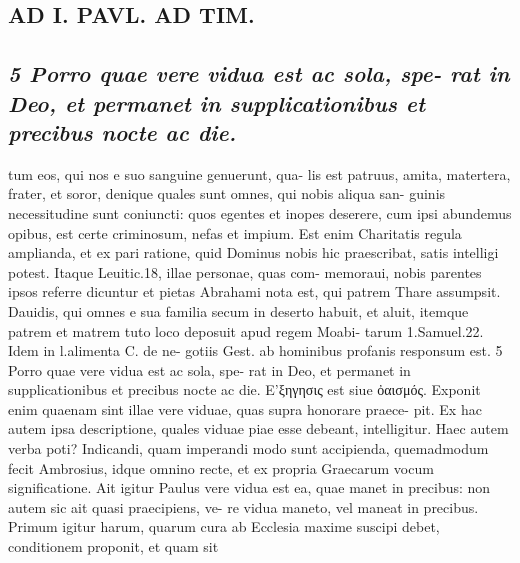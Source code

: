 \documentclass{article}
\begin{document}
\begin{pages}
\section*{AD I. PAVL. AD TIM. }
\marginpar{[ p.256 ]}\pstart {}
{}
\subsection*{\textit{5 Porro quae vere vidua est ac sola, spe- rat in Deo, et permanet in supplicationibus et precibus nocte ac die.}}tum eos, qui nos e suo sanguine genuerunt, qua- lis est patruus, amita, matertera, frater, et soror, denique quales sunt omnes, qui nobis aliqua san- guinis necessitudine sunt coniuncti: quos egentes et inopes deserere, cum ipsi abundemus opibus, est certe criminosum, nefas et impium. Est enim Charitatis regula amplianda, et ex pari ratione, quid Dominus nobis hic praescribat, satis intelligi potest. Itaque Leuitic.18, illae personae, quas com- memoraui, nobis parentes ipsos referre dicuntur et pietas Abrahami nota est, qui patrem Thare assumpsit. Dauidis, qui omnes e sua familia secum in deserto habuit, et aluit, itemque patrem et matrem tuto loco deposuit apud regem Moabi- tarum 1.Samuel.22. Idem in l.alimenta C. de ne- gotiis Gest. ab hominibus profanis responsum est. 5 Porro quae vere vidua est ac sola, spe- rat in Deo, et permanet in supplicationibus et precibus nocte ac die. Ε’ξηγησις est siue ὀαισμός. Exponit enim quaenam sint illae vere viduae, quas supra honorare praece- pit. Ex hac autem ipsa descriptione, quales viduae piae esse debeant, intelligitur. Haec autem verba poti? Indicandi, quam imperandi modo sunt accipienda, quemadmodum fecit Ambrosius, idque omnino recte, et ex propria Graecarum vocum significatione. Ait igitur Paulus vere vidua est ea, quae manet in precibus: non autem sic ait quasi praecipiens, ve- re vidua maneto, vel maneat in precibus. Primum igitur harum, quarum cura ab Ecclesia maxime suscipi debet, conditionem proponit, et quam sit  \pend

\end{pages}
\end{document}
